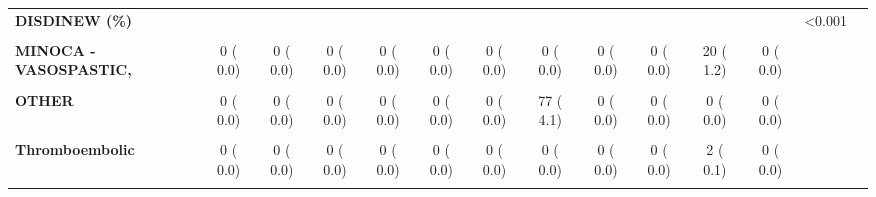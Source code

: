 \documentclass[
]{article}
\begin{document}
\begin{table}[H]
\begin{tabular}[t]{>{\raggedright\arraybackslash}p{5em}ccccccccccccc}
\textbf{DISDINEW (\%)} &  &  &  &  &  &  &  &  &  &  &  & <0.001 & \\
\textbf{\cellcolor{gray!10}{Microvascular}} & \cellcolor{gray!10}{0 (  0.0)} & \cellcolor{gray!10}{0 (  0.0)} & \cellcolor{gray!10}{0 (  0.0)} & \cellcolor{gray!10}{0 (  0.0)} & \cellcolor{gray!10}{0 (  0.0)} & \cellcolor{gray!10}{0 (  0.0)} & \cellcolor{gray!10}{0 (  0.0)} & \cellcolor{gray!10}{0 (  0.0)} & \cellcolor{gray!10}{0 (  0.0)} & \cellcolor{gray!10}{3 (  0.2)} & \cellcolor{gray!10}{0 (  0.0)} & \cellcolor{gray!10}{} & \cellcolor{gray!10}{}\\
\textbf{MINOCA - VASOSPASTIC,} & 0 (  0.0) & 0 (  0.0) & 0 (  0.0) & 0 (  0.0) & 0 (  0.0) & 0 (  0.0) & 0 (  0.0) & 0 (  0.0) & 0 (  0.0) & 20 (  1.2) & 0 (  0.0) &  & \\
\textbf{\cellcolor{gray!10}{NSTEMI}} & \cellcolor{gray!10}{380 ( 21.3)} & \cellcolor{gray!10}{599 ( 29.2)} & \cellcolor{gray!10}{646 ( 30.9)} & \cellcolor{gray!10}{751 ( 36.3)} & \cellcolor{gray!10}{633 ( 36.3)} & \cellcolor{gray!10}{669 ( 37.6)} & \cellcolor{gray!10}{793 ( 42.1)} & \cellcolor{gray!10}{814 ( 46.2)} & \cellcolor{gray!10}{885 ( 51.3)} & \cellcolor{gray!10}{835 ( 48.9)} & \cellcolor{gray!10}{749 ( 47.6)} & \cellcolor{gray!10}{} & \cellcolor{gray!10}{}\\
\textbf{OTHER} & 0 (  0.0) & 0 (  0.0) & 0 (  0.0) & 0 (  0.0) & 0 (  0.0) & 0 (  0.0) & 77 (  4.1) & 0 (  0.0) & 0 (  0.0) & 0 (  0.0) & 0 (  0.0) &  & \\
\textbf{\cellcolor{gray!10}{STE MI}} & \cellcolor{gray!10}{901 ( 50.4)} & \cellcolor{gray!10}{891 ( 43.5)} & \cellcolor{gray!10}{891 ( 42.6)} & \cellcolor{gray!10}{892 ( 43.1)} & \cellcolor{gray!10}{767 ( 44.0)} & \cellcolor{gray!10}{760 ( 42.8)} & \cellcolor{gray!10}{727 ( 38.6)} & \cellcolor{gray!10}{686 ( 39.0)} & \cellcolor{gray!10}{664 ( 38.5)} & \cellcolor{gray!10}{687 ( 40.2)} & \cellcolor{gray!10}{622 ( 39.6)} & \cellcolor{gray!10}{} & \cellcolor{gray!10}{}\\
\textbf{Thromboembolic} & 0 (  0.0) & 0 (  0.0) & 0 (  0.0) & 0 (  0.0) & 0 (  0.0) & 0 (  0.0) & 0 (  0.0) & 0 (  0.0) & 0 (  0.0) & 2 (  0.1) & 0 (  0.0) &  & \\
\textbf{\cellcolor{gray!10}{UAP}} & \cellcolor{gray!10}{505 ( 28.3)} & \cellcolor{gray!10}{558 ( 27.2)} & \cellcolor{gray!10}{557 ( 26.6)} & \cellcolor{gray!10}{425 ( 20.6)} & \cellcolor{gray!10}{345 ( 19.8)} & \cellcolor{gray!10}{348 ( 19.6)} & \cellcolor{gray!10}{288 ( 15.3)} & \cellcolor{gray!10}{261 ( 14.8)} & \cellcolor{gray!10}{177 ( 10.3)} & \cellcolor{gray!10}{162 (  9.5)} & \cellcolor{gray!10}{201 ( 12.8)} & \cellcolor{gray!10}{} & \cellcolor{gray!10}{}\\

\end{tabular}
\end{table}
\end{document}
